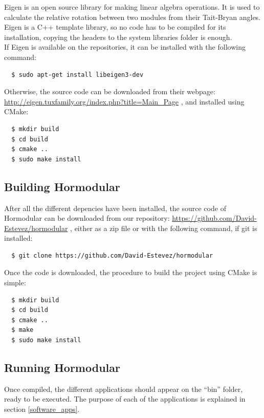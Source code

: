 Eigen is an open source library for making linear algebra operations. It is used to calculate the relative rotation between two modules from their Tait-Bryan angles. Eigen is a C++ template library, so no code has to be compiled for its installation, copying the headers to the system libraries folder is enough.\\

If Eigen is available on the repositories, it can be installed with the following command:
\Bash
\begin{lstlisting}
  $ sudo apt-get install libeigen3-dev
\end{lstlisting}

Otherwise, the source code can be downloaded from their webpage: \url{http://eigen.tuxfamily.org/index.php?title=Main_Page} , and installed using CMake:
\Bash
\begin{lstlisting}
  $ mkdir build
  $ cd build
  $ cmake ..
  $ sudo make install
\end{lstlisting}


\subsection{Building Hormodular}
\label{software_install_hormodular}

After all the different depencies have been installed, the source code of Hormodular can be downloaded from our repository: \url{https://github.com/David-Estevez/hormodular} , either as a zip file or with the following command, if git is installed:
\Bash
\begin{lstlisting}
  $ git clone https://github.com/David-Estevez/hormodular
\end{lstlisting}

Once the code is downloaded, the procedure to build the project using CMake is simple:\Bash
\begin{lstlisting}
  $ mkdir build
  $ cd build
  $ cmake ..
  $ make
  $ sudo make install
\end{lstlisting}

\subsection{Running Hormodular}
\label{software_run_hormodular}

Once compiled, the different applications should appear on the ``bin'' folder, ready to be executed. The purpose of each of the applications is explained in section \ref{software_apps}.